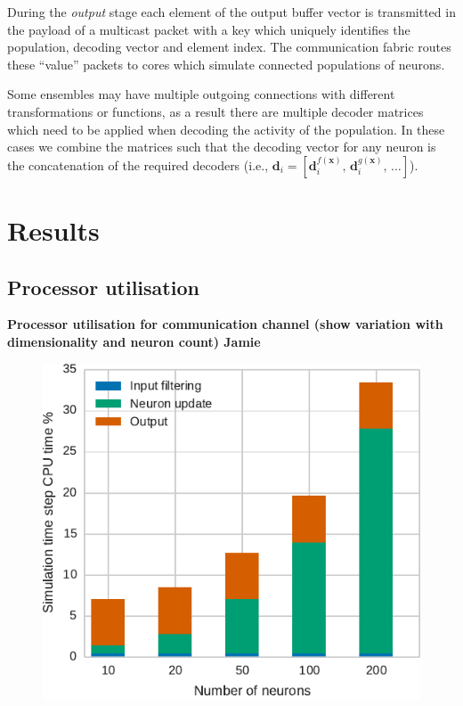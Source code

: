 \documentclass[conference]{IEEEtran}
\renewcommand{\vec}{\mathbf}  %
\begin{document}
  During the \textit{output} stage each element of the output buffer vector is transmitted in the payload of a multicast packet with a key which uniquely identifies the population, decoding vector and element index.
  The communication fabric routes these ``value'' packets to cores which simulate connected populations of neurons.

  Some ensembles may have multiple outgoing connections with different transformations or functions, as a result there are multiple decoder matrices which need to be applied when decoding the activity of the population.
  In these cases we combine the matrices such that the decoding vector for any neuron is the concatenation of the required decoders
  (i.e., $\vec{d}_i = \left[\vec{d}_i^{f(\vec{x})},\,\vec{d}_i^{g(\vec{x})},\,\ldots \right]$).

  \section{Results}
  \label{sec:results}

  \subsection{Processor utilisation}

  \textbf{Processor utilisation for communication channel (show variation with dimensionality and neuron count) \color{red} Jamie}

  \begin{figure}[!t]
    \includegraphics{figures/comm_channel_cpu_16d_bar}
    \caption{}
    \label{fig:results/comm-channel-cpu-16d}
  \end{figure}
\end{document}

